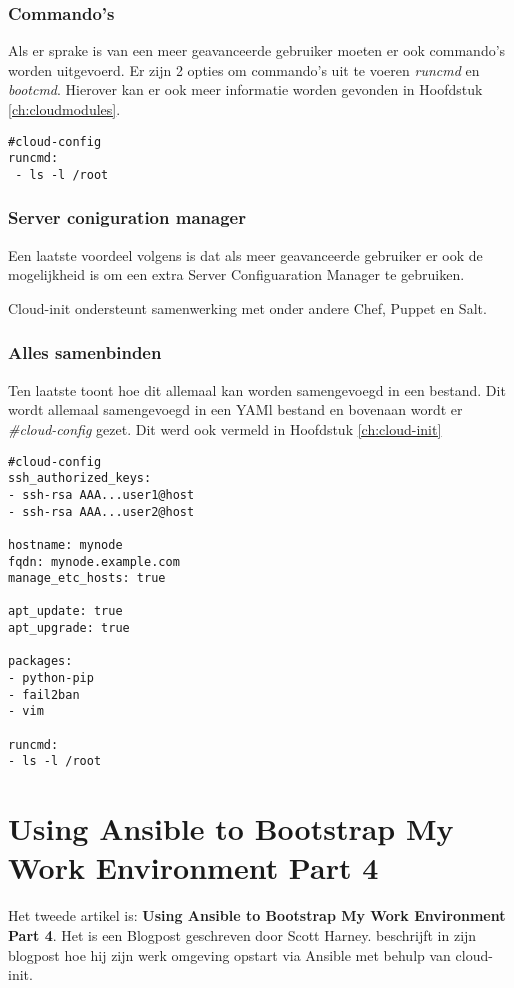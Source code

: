 \subsubsection{Commando's}
Als er sprake is van een meer geavanceerde gebruiker moeten er ook commando's worden uitgevoerd. Er zijn 2 opties om commando's uit te voeren \textit{runcmd} en \textit{bootcmd}. Hierover kan er ook meer informatie worden gevonden in Hoofdstuk \ref*{ch:cloudmodules}.
\begin{lstlisting}
#cloud-config
runcmd:
 - ls -l /root
\end{lstlisting} 
\subsubsection{Server coniguration manager}
Een laatste voordeel volgens \autocite{viktorpet} is dat als meer geavanceerde gebruiker er ook de mogelijkheid is om een extra Server Configuaration Manager te gebruiken. 

Cloud-init ondersteunt samenwerking met onder andere Chef, Puppet en Salt.
\subsubsection{Alles samenbinden}
Ten laatste toont \autocite{viktorpet} hoe dit allemaal kan worden samengevoegd in een bestand. Dit wordt allemaal samengevoegd in een YAMl bestand en bovenaan wordt er \textit{\#cloud-config} gezet. Dit werd ook vermeld in Hoofdstuk \ref*{ch:cloud-init}
\begin{lstlisting}
#cloud-config
ssh_authorized_keys:
- ssh-rsa AAA...user1@host
- ssh-rsa AAA...user2@host

hostname: mynode
fqdn: mynode.example.com
manage_etc_hosts: true

apt_update: true
apt_upgrade: true

packages:
- python-pip
- fail2ban
- vim

runcmd:
- ls -l /root
\end{lstlisting} 

\section{Using Ansible to Bootstrap My Work Environment Part 4}
Het tweede artikel is: \textbf{Using Ansible to Bootstrap My Work Environment Part 4}. Het is een Blogpost geschreven door Scott Harney. \autocite{scottharney} beschrijft in zijn blogpost hoe hij zijn werk omgeving opstart via Ansible met behulp van cloud-init. 

